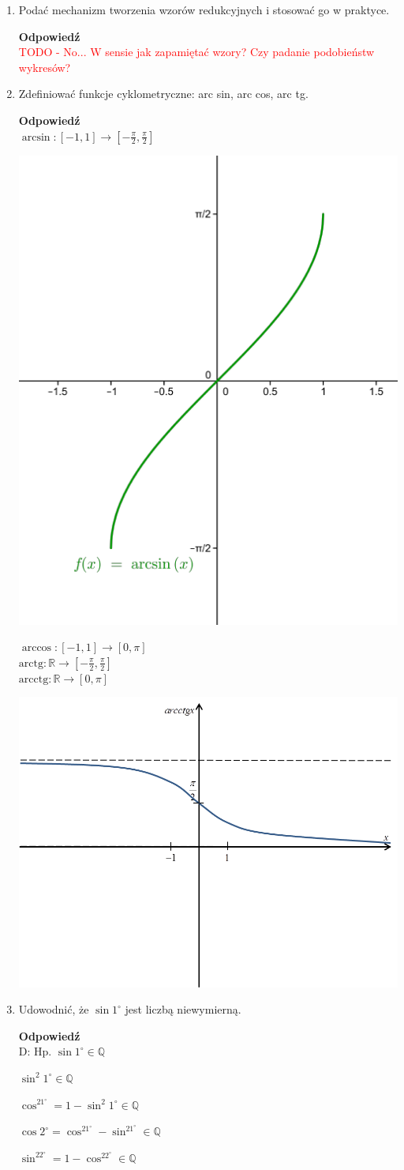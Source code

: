 \documentclass[12pt,a4paper]{article}
\theoremstyle{break}
\newcommand{\Odp}[1]{
		\begin{mdframed}[style=zadanie]
			\textbf{Odpowiedź}\\
			#1
		\end{mdframed}
	}
\newcommand{\arctg}{\text{arctg}}
\newcommand{\arcctg}{\text{arcctg}}
\begin{document}
\begin{enumerate}[1.]
	\item Podać mechanizm tworzenia wzorów redukcyjnych i stosować go w praktyce.
	\Odp{
		\textcolor{red}{TODO - No... W sensie jak zapamiętać wzory? Czy padanie podobieństw wykresów?}
	}
	
	\item Zdeﬁniować funkcje cyklometryczne: arc sin, arc cos, arc tg.
	\Odp{
		$\arcsin: [-1,1] \rightarrow [-\frac{\pi}{2},\frac{\pi}{2}]$
		
		\includegraphics[width=0.4\linewidth]{arcsin.png}
		
		$\arccos: [-1,1] \rightarrow [0,\pi]$\\
		
		$\arctg: \mathbb{R} \rightarrow [-\frac{\pi}{2},\frac{\pi}{2}]$\\
		
		$\arcctg: \mathbb{R} \rightarrow [0,\pi]$
		
		\includegraphics[width=0.4\linewidth]{arcctg.png}
	}
	
	\item Udowodnić, że $\sin 1^\circ$ jest liczbą niewymierną.
	\Odp{
		D: Hp. $\sin 1^\circ \in \mathbb{Q}$
		
		$\sin^2 1^\circ \in \mathbb{Q}$
		
		$\cos^21^\circ = 1- \sin^2 1^\circ \in \mathbb{Q}$
		
		$\cos 2^\circ = \cos^21^\circ - \sin^21^\circ \in \mathbb{Q}$
		
		$\sin^22^\circ = 1-\cos^22^\circ \in \mathbb{Q}$
		
}
\end{enumerate}
\end{document}
